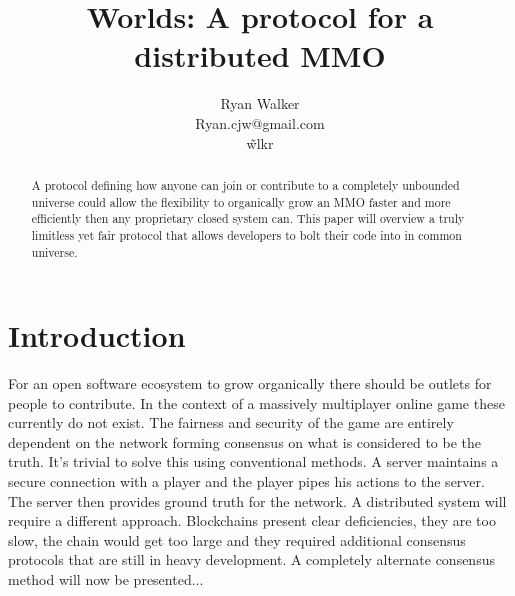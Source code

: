 \documentclass[runningheads,a4paper]{llncs}
\begin{document}
\def \SystemName {Worlds} %

\mainmatter  %

\title{\SystemName: A protocol for a distributed MMO}

\author{Ryan Walker\\
				Ryan.cjw@gmail.com\\
				\~wlkr}


\maketitle


%  

\begin{abstract}
A protocol defining how anyone can join or contribute to a completely unbounded universe could allow the flexibility to organically grow an MMO faster and more efficiently then any proprietary closed system can. This paper will overview a truly limitless yet fair protocol that allows developers to bolt their code into in common universe. 
\end{abstract}

\section{Introduction}
For an open software ecosystem to grow organically there should be outlets for people to contribute. In the context of a massively multiplayer online game these currently do not exist. The fairness and security of the game are entirely dependent on the network forming consensus on what is considered to be the truth. It's trivial to solve this using conventional methods. A server maintains a secure connection with a player and the player pipes his actions to the server. The server then provides ground truth for the network. A distributed system will require a different approach. Blockchains present clear deficiencies, they are too slow, the chain would get too large and they required additional consensus protocols that are still in heavy development. A completely alternate consensus method will now be presented...
\end{document}
